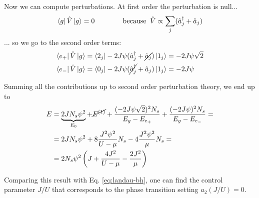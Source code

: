 Now we can compute perturbations. At first order the perturbation is null...
$$\bra{g}\hat{V}\ket{g} = 0 \qquad\qquad \text{because}\;\; \hat{V} \propto \sum_j (\hat{a}^\dag_j + \hat{a}_j)$$
%
... so we go to the second order terms:
\begin{align*}
    \bra{e_+}\hat{V}\ket{g} &= \bra{2_j}-2J\psi(\hat{a}^\dag_j+\cancel{\hat{a}_j})\ket{1_j} = -2J\psi\sqrt2\\
    \bra{e_-}\hat{V}\ket{g} &= \bra{0_j}-2J\psi(\cancel{\hat{a}^\dag_j}+\hat{a}_j)\ket{1_j} = -2J\psi
\end{align*}

\noindent Summing all the contributions up to second order perturbation theory, we end up to
\begin{align*}
    E &= \underbrace{2JN_s\psi^2}_{E_0} + \cancel{E^{(1)}} 
    + \frac{(-2J\psi\sqrt2)^2N_s}{E_g-E_{e_+}}
    + \frac{(-2J\psi)^2N_s}{E_g-E_{e_-}} =\\
    &= 2JN_s\psi^2 + 8\frac{J^2\psi^2}{U-\mu}N_s - 4\frac{J^2\psi^2}{\mu}N_s =\\
    &= 2N_s\psi^2 
    \left( J + \frac{4J^2}{U-\mu} - \frac{2J^2}{\mu} \right)
\end{align*}

Comparing this result with Eq. \ref{eq:landau-bh}, one can find the control parameter $J/U$ that corresponds to the phase transition setting $a_2(J/U) = 0$.


